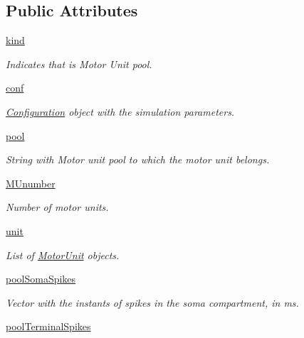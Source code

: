 \subsection*{Public Attributes}
\begin{DoxyCompactItemize}
\item 
\hyperlink{class_motor_unit_pool_1_1_motor_unit_pool_aeb57d0463ad56a16b166d00dc6079b95}{kind}
\begin{DoxyCompactList}\small\item\em Indicates that is Motor Unit pool. \end{DoxyCompactList}\item 
\hyperlink{class_motor_unit_pool_1_1_motor_unit_pool_a3b2ee8f3e5500bfdc8fa731a5cb7d622}{conf}
\begin{DoxyCompactList}\small\item\em \hyperlink{namespace_configuration}{Configuration} object with the simulation parameters. \end{DoxyCompactList}\item 
\hyperlink{class_motor_unit_pool_1_1_motor_unit_pool_a832364dc014aa8a1b2947abfe063f626}{pool}
\begin{DoxyCompactList}\small\item\em String with Motor unit pool to which the motor unit belongs. \end{DoxyCompactList}\item 
\hyperlink{class_motor_unit_pool_1_1_motor_unit_pool_aa5884530baaa20f46007805bc574407d}{M\+Unumber}
\begin{DoxyCompactList}\small\item\em Number of motor units. \end{DoxyCompactList}\item 
\hyperlink{class_motor_unit_pool_1_1_motor_unit_pool_a1b14c831606c27efae62f1468850393b}{unit}
\begin{DoxyCompactList}\small\item\em List of \hyperlink{namespace_motor_unit}{Motor\+Unit} objects. \end{DoxyCompactList}\item 
\hyperlink{class_motor_unit_pool_1_1_motor_unit_pool_a3790757a111061662ad0f98120b25e69}{pool\+Soma\+Spikes}
\begin{DoxyCompactList}\small\item\em Vector with the instants of spikes in the soma compartment, in ms. \end{DoxyCompactList}\item 
\hyperlink{class_motor_unit_pool_1_1_motor_unit_pool_a4f0b93df27eb6303fa1a3d49653d4fd3}{pool\+Terminal\+Spikes}

\end{DoxyCompactItemize}

